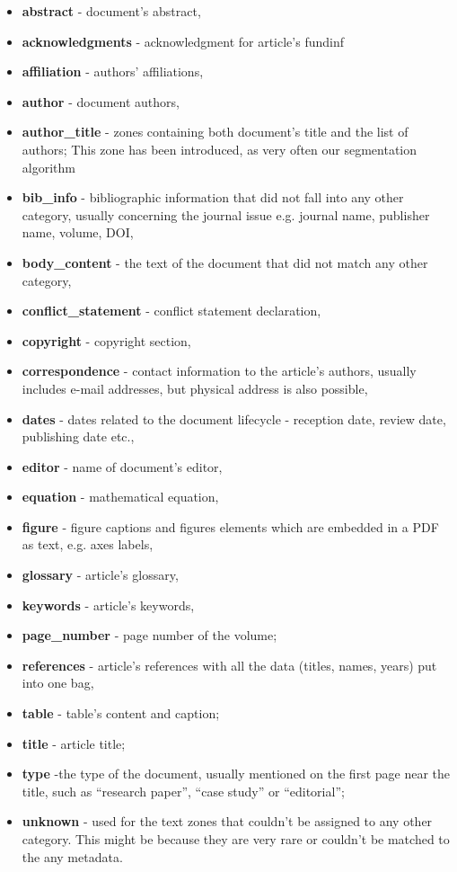 \begin{itemize}
    \item \textbf{abstract} - document's abstract,
    \item \textbf{acknowledgments} - acknowledgment for article's fundinf
    \item \textbf{affiliation} - authors' affiliations,
    \item \textbf{author} - document authors,
    \item \textbf{author\_title} - zones containing both document's title and the list of authors; This zone has been introduced, as very often our segmentation algorithm 
    \item \textbf{bib\_info} - bibliographic information that did not fall into any other category, usually concerning the journal issue e.g. journal name, publisher name, volume, DOI,
    \item \textbf{body\_content} - the text of the document that did not match any other category,
    \item \textbf{conflict\_statement} - conflict statement declaration,
    \item \textbf{copyright} - copyright section,
    \item \textbf{correspondence} - contact information to the article's authors, usually includes e-mail addresses, but physical address is also possible,
    \item \textbf{dates} - dates related to the document lifecycle - reception date, review date, publishing date etc.,
    \item \textbf{editor} - name of document's editor,
    \item \textbf{equation} - mathematical equation,
    \item \textbf{figure} - figure captions and figures elements which are embedded in a PDF as text, e.g. axes labels,
    \item \textbf{glossary} - article's glossary,
    \item \textbf{keywords} - article's keywords,
    \item \textbf{page\_number} - page number of the volume;
    \item \textbf{references} - article's references with all the data (titles, names, years) put into one bag,
    \item \textbf{table} - table's content and caption;
    \item \textbf{title} - article title;
    \item \textbf{type} -the type of the document, usually mentioned on the first page near the title, such as ``research paper'', ``case study'' or ``editorial'';
    \item \textbf{unknown} - used for the text zones that couldn't be assigned to any other category. This might be because they are very rare or couldn't be matched to the any metadata.
\end{itemize}
